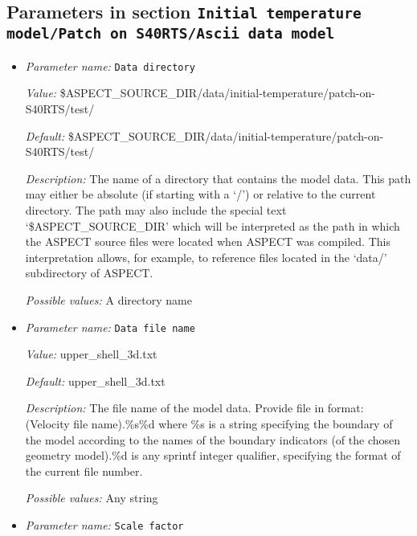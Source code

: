 


\subsection{Parameters in section \tt Initial temperature model/Patch on S40RTS/Ascii data model}
\label{parameters:Initial_20temperature_20model/Patch_20on_20S40RTS/Ascii_20data_20model}

\begin{itemize}
\item {\it Parameter name:} {\tt Data directory}
\label{parameters:Initial temperature model/Patch on S40RTS/Ascii data model/Data directory}


{\it Value:} \$ASPECT\_SOURCE\_DIR/data/initial-temperature/patch-on-S40RTS/test/


{\it Default:} \$ASPECT\_SOURCE\_DIR/data/initial-temperature/patch-on-S40RTS/test/


{\it Description:} The name of a directory that contains the model data. This path may either be absolute (if starting with a `/') or relative to the current directory. The path may also include the special text `\$ASPECT\_SOURCE\_DIR' which will be interpreted as the path in which the ASPECT source files were located when ASPECT was compiled. This interpretation allows, for example, to reference files located in the `data/' subdirectory of ASPECT. 


{\it Possible values:} A directory name
\item {\it Parameter name:} {\tt Data file name}
\label{parameters:Initial temperature model/Patch on S40RTS/Ascii data model/Data file name}


{\it Value:} upper\_shell\_3d.txt


{\it Default:} upper\_shell\_3d.txt


{\it Description:} The file name of the model data. Provide file in format: (Velocity file name).\%s\%d where \%s is a string specifying the boundary of the model according to the names of the boundary indicators (of the chosen geometry model).\%d is any sprintf integer qualifier, specifying the format of the current file number. 


{\it Possible values:} Any string
\item {\it Parameter name:} {\tt Scale factor}
\label{parameters:Initial temperature model/Patch on S40RTS/Ascii data model/Scale factor}



\end{itemize}
